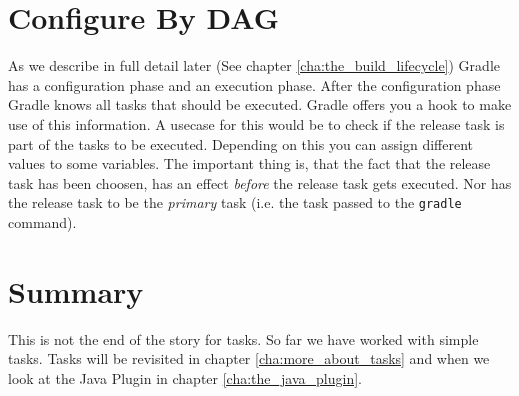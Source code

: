 \section{Configure By DAG}
As we describe in full detail later (See chapter \ref{cha:the_build_lifecycle}) Gradle has a configuration phase and an execution phase. After the configuration phase Gradle knows all tasks that should be executed. Gradle offers you a hook to make use of this information. A usecase for this would be to check if the release task is part of the tasks to be executed. Depending on this you can assign different values to some variables.
The important thing is, that the fact that the release task has been choosen, has an effect \emph{before} the release task gets executed. Nor has the release task to be the \emph{primary} task (i.e. the task passed to the \texttt{gradle} command). 

  
\section{Summary}
This is not the end of the story for tasks. So far we have worked with simple tasks. Tasks will be revisited in chapter \ref{cha:more_about_tasks} and when we look at the Java Plugin in chapter \ref{cha:the_java_plugin}.

